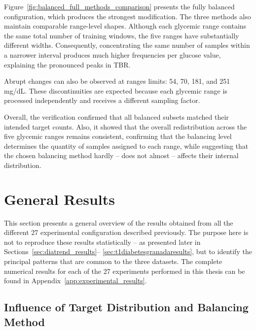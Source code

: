 Figure~\ref{fig:balanced_full_methods_comparison} presents the fully balanced configuration, which produces the strongest modification. The three methods also maintain comparable range-level shapes. Although each glycemic range contains the same total number of training windows, the five ranges have substantially different widths. Consequently, concentrating the same number of samples within a narrower interval produces much higher frequencies per glucose value, explaining the pronounced peaks in TBR.

Abrupt changes can also be observed at ranges limits: 54, 70, 181, and 251 mg/dL. These discontinuities are expected because each glycemic range is processed independently and receives a different sampling factor.

Overall, the verification confirmed that all balanced subsets matched their intended target counts. Also, it showed that the overall redistribution across the five glycemic ranges remains consistent, confirming that the balancing level determines the quantity of samples assigned to each range, while suggesting that the chosen balancing method hardly -- does not almost -- affects their internal distribution.

\clearpage

\section{General Results}
\label{sec:general_results}

This section presents a general overview of the results obtained from all the different 27 experimental configuration described previously. The purpose here is not to reproduce these results statistically -- as presented later in Sections~\ref{sec:diatrend_results}--
\ref{sec:t1diabetesgranadaresults}, but to identify the principal patterns that are common to the three datasets. The complete numerical results for each of the 27 experiments performed in this thesis can be found in Appendix~\ref{app:experimental_results}.


\subsection{Influence of Target Distribution and Balancing Method}
\label{subsec:general_target_method}

